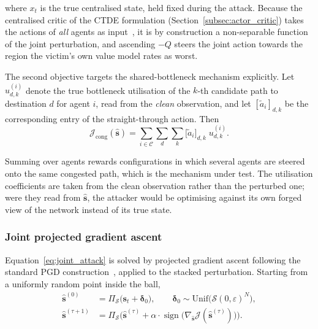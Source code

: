 \noindent where $x_t$ is the true centralised state, held fixed during the attack.
Because the centralised critic of the CTDE formulation
(Section~\ref{subsec:actor_critic}) takes the actions of \emph{all} agents as
input~\cite{lowe2017multi}, it is by construction a non-separable function of the
joint perturbation, and ascending $-Q$ steers the joint action towards the region
the victim's own value model rates as worst.

The second objective targets the shared-bottleneck mechanism explicitly. Let
$u^{(i)}_{d,k}$ denote the true bottleneck utilisation of the $k$-th candidate path
to destination $d$ for agent $i$, read from the \emph{clean} observation, and let
$[\tilde{a}_i]_{d,k}$ be the corresponding entry of the straight-through action.
Then
\begin{equation}
  \mathcal{J}_{\text{cong}}(\hat{\mathbf{s}})
  = \sum_{i \in \mathcal{C}} \sum_{d} \sum_{k}
    \big[\tilde{a}_i\big]_{d,k} \; u^{(i)}_{d,k}.
  \label{eq:obj_congestion}
\end{equation}

\noindent Summing over agents rewards configurations in which several agents are
steered onto the same congested path, which is the mechanism under test. The
utilisation coefficients are taken from the clean observation rather than the
perturbed one; were they read from $\hat{\mathbf{s}}$, the attacker would be
optimising against its own forged view of the network instead of its true state.

\subsubsection*{Joint projected gradient ascent}

Equation~\eqref{eq:joint_attack} is solved by projected gradient ascent following
the standard PGD construction~\cite{madry2019deeplearningmodelsresistant}, applied
to the stacked perturbation. Starting from a uniformly random point inside the ball,
\begin{align}
  \hat{\mathbf{s}}^{(0)}   & = \Pi_{\mathcal{S}}\big( \mathbf{s}_t + \boldsymbol{\delta}_0 \big),
    \qquad \boldsymbol{\delta}_0 \sim \mathrm{Unif}\big(\mathcal{S}(0,\varepsilon)^{N}\big), \\
  \hat{\mathbf{s}}^{(\tau+1)} & = \Pi_{\mathcal{S}}\Big(
      \hat{\mathbf{s}}^{(\tau)} + \alpha \cdot
      \operatorname{sign}\big( \nabla_{\hat{\mathbf{s}}} \mathcal{J}(\hat{\mathbf{s}}^{(\tau)}) \big)
    \Big).
  \label{eq:joint_pgd_iteration}
\end{align}

